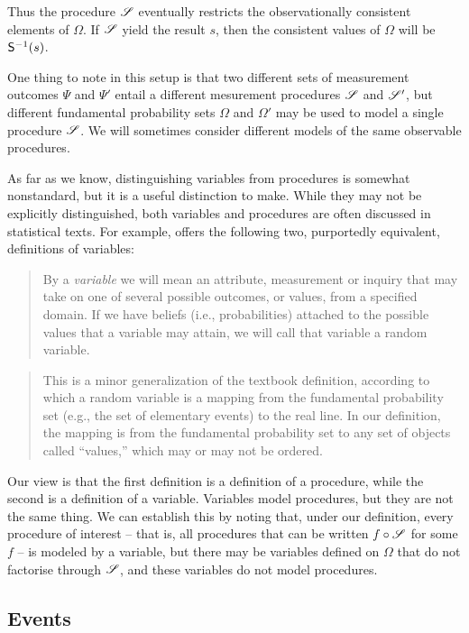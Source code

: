 Thus the procedure $\mathscr{S}$ eventually restricts the observationally consistent elements of $\Omega$. If $\mathscr{S}$ yield the result $s$, then the consistent values of $\Omega$ will be $\mathsf{S}^{-1}(s)$.

One thing to note in this setup is that two different sets of measurement outcomes $\Psi$ and $\Psi'$ entail a different mesurement procedures $\mathscr{S}$ and $\mathscr{S}'$, but different fundamental probability sets $\Omega$ and $\Omega'$ may be used to model a single procedure $\mathscr{S}$. We will sometimes consider different models of the same observable procedures.

As far as we know, distinguishing variables from procedures is somewhat nonstandard, but it is a useful distinction to make. While they may not be explicitly distinguished, both variables and procedures are often discussed in statistical texts. For example, \citet{pearl_causality:_2009} offers the following two, purportedly equivalent, definitions of variables:
\begin{quote}
By a \emph{variable} we will mean an attribute, measurement or inquiry that may take on one of several possible outcomes, or values, from a specified domain. If we have beliefs (i.e., probabilities) attached to the possible values that a variable may attain, we will call that variable a random variable.
\end{quote}

\begin{quote}
This is a minor generalization of the textbook definition, according to which a random variable is a mapping from the fundamental probability set (e.g., the set of elementary events) to the real line. In our definition, the mapping is from the fundamental probability set to any set of objects called ``values,'' which may or may not be ordered.
\end{quote}

Our view is that the first definition is a definition of a procedure, while the second is a definition of a variable. Variables model procedures, but they are not the same thing. We can establish this by noting that, under our definition, every procedure of interest -- that is, all procedures that can be written $f\circ \mathscr{S}$ for some $f$ -- is modeled by a variable, but there may be variables defined on $\Omega$ that do not factorise through $\mathscr{S}$, and these variables do not model procedures.

\subsection{Events}

